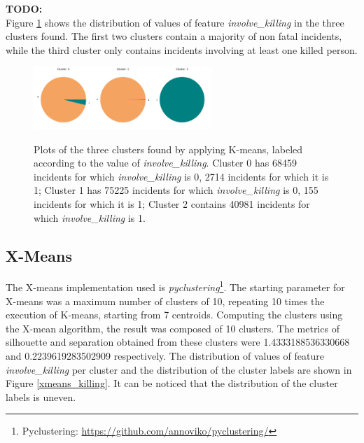 \documentclass[10pt,a4paper]{report}
\begin{document}
\textbf{TODO:}\\
Figure \ref{kmeans_killing} shows the distribution of values of feature \textit{involve\_killing} in the three clusters found.
The first two clusters contain a majority of non fatal incidents, while the third cluster only contains incidents involving at least one killed person.
\begin{figure}[h]
	\centering
	\includegraphics[width=0.2\textwidth]{kmeans_0}\includegraphics[width=0.2\textwidth]{kmeans_1}\includegraphics[width=0.2\textwidth]{kmeans_2}
	\caption{Plots of the three clusters found by applying K-means, labeled according to the value of \textit{involve\_killing}.
	Cluster 0 has 68459 incidents for which \textit{involve\_killing} is 0, 2714 incidents for which it is 1;
	Cluster 1 has 75225 incidents for which \textit{involve\_killing} is 0, 155 incidents for which it is 1;
	Cluster 2 contains 40981 incidents for which \textit{involve\_killing} is 1.}
	\label{kmeans_killing}
\end{figure}

\subsection{X-Means}

The X-means implementation used is \textit{pyclustering}\footnote{Pyclustering: \url{https://github.com/annoviko/pyclustering/}}.
The starting parameter for X-means was a maximum number of clusters of 10, repeating 10 times the execution of K-means, starting from 7 centroids.
Computing the clusters using the X-mean algorithm, the result was composed of 10 clusters.
The metrics of silhouette and separation obtained from these clusters were 1.4333188536330668 and 0.2239619283502909 respectively.
The distribution of values of feature \textit{involve\_killing} per cluster and the distribution of the cluster labels are shown in Figure \ref{xmeans_killing}.
It can be noticed that the distribution of the cluster labels is uneven.
\end{document}
